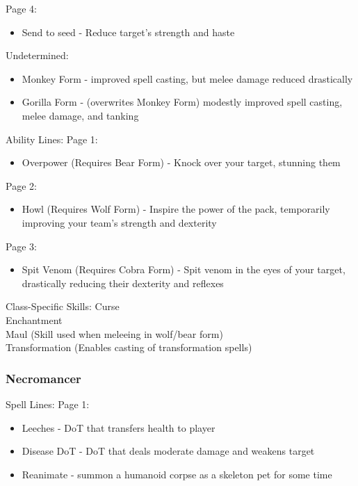 \documentclass{article}
\begin{document}
Page 4:
\begin{itemize}
    \item Send to seed - Reduce target's strength and haste
\end{itemize}

Undetermined:
\begin{itemize}
    \item Monkey Form - improved spell casting, but melee damage reduced drastically
    \item Gorilla Form - (overwrites Monkey Form) modestly improved spell casting, melee damage, and tanking
    
\end{itemize}

Ability Lines:
Page 1:
\begin{itemize}
    \item Overpower (Requires Bear Form) - Knock over your target, stunning them
    
\end{itemize}

Page 2:
\begin{itemize}
    \item Howl (Requires Wolf Form) - Inspire the power of the pack, temporarily improving your team's strength and dexterity
\end{itemize}

Page 3:
\begin{itemize}
    \item Spit Venom (Requires Cobra Form) - Spit venom in the eyes of your target, drastically reducing their
        dexterity and reflexes
\end{itemize}



Class-Specific Skills:
Curse\\
Enchantment\\
Maul (Skill used when meleeing in wolf/bear form)\\
Transformation (Enables casting of transformation spells)\\


\subsubsection{Necromancer}
Spell Lines:
Page 1:
\begin{itemize}
    \item Leeches - DoT that transfers health to player
    \item Disease DoT - DoT that deals moderate damage and weakens target
    \item Reanimate - summon a humanoid corpse as a skeleton pet for some time
    
\end{itemize}
\end{document}
